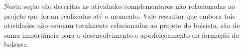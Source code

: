 Nesta seção são descritas as atividades complementares não relacionadas ao projeto que foram realizadas até o momento. Vale ressaltar que embora tais atividades não estejam totalmente relacionadas ao projeto do bolsista, são de suma importância para o desenvolvimento e aperfeiçoamento da formação do bolsista. 